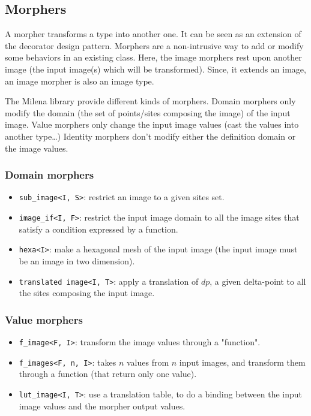 \subsection{Morphers}

A morpher transforms a type into another one.
It can be seen as an extension of the decorator design pattern.
Morphers are a non-intrusive way to add or modify some behaviors in an
existing class.
Here, the image morphers rest upon another image (the input image(s) which
will be transformed).
Since, it extends an image, an image morpher is also an image type.

The Milena library provide different kinds of morphers.
Domain morphers only modify the domain (the set of points/sites composing the image) of the input image.
Value morphers only change the input image values (cast the values into another
type\ldots{})
Identity morphers don't modify either the definition domain or the image
values.



\subsubsection{Domain morphers}

\begin{itemize}

\item{\verb+sub_image<I, S>+:} restrict an image to a given sites set.

\item{\verb+image_if<I, F>+:} restrict the input image domain to all the image
sites that satisfy a condition expressed by a function.

\item{\verb+hexa<I>+:}  make a hexagonal mesh of the input image (the input
image must be an image in two dimension).

\item{\verb+translated image<I, T>+:} apply a translation of $dp$, a given
delta-point to all the sites composing the input image.
\end{itemize}

\subsubsection{Value morphers}

\begin{itemize}

\item{\verb+f_image<F, I>+:} transform the image values through a "function".

\item{\verb+f_images<F, n, I>+:} takes $n$ values from $n$ input images,
and transform them through a function (that return only one value).

\item{\verb+lut_image<I, T>+:} use a translation table, to do a binding between the input image values and the morpher output values.

\end{itemize}


